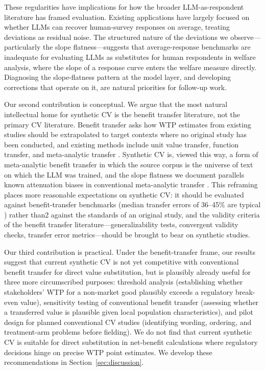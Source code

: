 \documentclass[12pt]{article}
\begin{document}
These regularities have implications for how the broader
LLM-as-respondent literature has framed evaluation. Existing applications
\parencite{Brand2024, Horton2023, Aher2023} have largely focused on whether
LLMs can recover human-survey responses on average, treating deviations as
residual noise. The structured nature of the deviations we observe---
particularly the slope flatness---suggests that average-response benchmarks
are inadequate for evaluating LLMs as substitutes for human respondents in
welfare analysis, where the slope of a response curve enters the welfare
measure directly. Diagnosing the slope-flatness pattern at the model layer,
and developing corrections that operate on it, are natural priorities for
follow-up work.

Our second contribution is conceptual. We argue that the most natural
intellectual home for synthetic CV is the benefit transfer literature, not
the primary CV literature. Benefit transfer asks how WTP estimates from
existing studies should be extrapolated to target contexts where no original
study has been conducted, and existing methods include unit value transfer,
function transfer, and meta-analytic transfer
\parencite{Rosenberger2017, Loomis2015, Boyle2010}. Synthetic CV is, viewed
this way, a form of meta-analytic benefit transfer in which the source
corpus is the universe of text on which the LLM was trained, and the slope flatness we document parallels known attenuation biases in conventional meta-analytic transfer \parencite{Bergstrom2006}. This reframing places more
reasonable expectations on synthetic CV: it should be evaluated against
benefit-transfer benchmarks (median transfer errors of 36--45\% are
typical \parencite{Rosenberger2017}) rather than2 against the standards of an original study, and the
validity criteria of the benefit transfer literature---generalizability
tests, convergent validity checks, transfer error metrics---should be
brought to bear on synthetic studies.

Our third contribution is practical. Under the benefit-transfer frame, our
results suggest that current synthetic CV is not yet competitive with
conventional benefit transfer for direct value substitution, but is
plausibly already useful for three more circumscribed purposes: threshold
analysis (establishing whether stakeholders' WTP for a non-market good
plausibly exceeds a regulatory break-even value), sensitivity testing of
conventional benefit transfer (assessing whether a transferred value is
plausible given local population characteristics), and pilot design for
planned conventional CV studies (identifying wording, ordering, and
treatment-arm problems before fielding). We do not find that current
synthetic CV is suitable for direct substitution in net-benefit calculations
where regulatory decisions hinge on precise WTP point estimates. We develop
these recommendations in Section~\ref{sec:discussion}.
\end{document}
